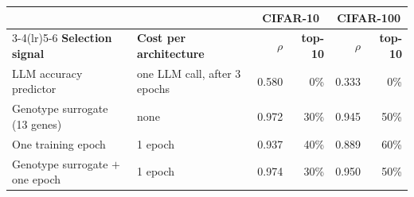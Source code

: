 \begin{tabular}{l l rr rr}
\toprule
& & \multicolumn{2}{c}{CIFAR-10} & \multicolumn{2}{c}{CIFAR-100} \\
\cmidrule(lr){3-4}\cmidrule(lr){5-6}
\textbf{Selection signal} & \textbf{Cost per architecture} & $\rho$ & \textbf{top-10} & $\rho$ & \textbf{top-10} \\
\midrule
LLM accuracy predictor & one LLM call, after 3 epochs & 0.580 & 0\% & 0.333 & 0\% \\
Genotype surrogate (13 genes) & none & 0.972 & 30\% & 0.945 & 50\% \\
One training epoch & 1 epoch & 0.937 & 40\% & 0.889 & 60\% \\
Genotype surrogate $+$ one epoch & 1 epoch & 0.974 & 30\% & 0.950 & 50\% \\
\bottomrule
\end{tabular}
